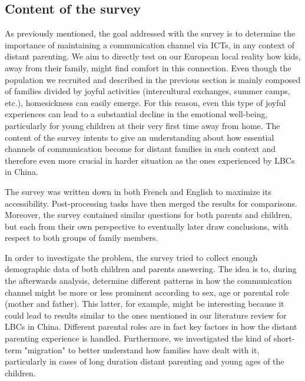 \subsection{Content of the survey}
\label{content-survey}

As previously mentioned, the goal addressed with the survey is to determine the importance of maintaining a communication channel via ICTs, in any context of distant parenting. We aim to directly test on our European local reality how kids, away from their family, might find comfort in this connection. Even though the population we recruited and described in the previous section is mainly composed of families divided by joyful activities (intercultural exchanges, summer camps, etc.), homesickness can easily emerge. For this reason, even this type of joyful experiences can lead to a substantial decline in the emotional well-being, particularly for young children at their very first time away from home. The content of the survey intents to give an understanding about how essential channels of communication become for distant families in such context and therefore even more crucial in harder situation as the ones experienced by LBCs in China.

The survey was written down in both French and English to maximize its accessibility. Post-processing tasks have then merged the results for comparisons. Moreover, the survey contained similar questions for both parents and children, but each from their own perspective to eventually later draw conclusions, with respect to both groups of family members.

In order to investigate the problem, the survey tried to collect enough demographic data of both children and parents answering. The idea is to, during the afterwards analysis, determine different patterns in how the communication channel might be more or less prominent according to sex, age or parental role (mother and father). This latter, for example, might be interesting because it could lead to results similar to the ones mentioned in our literature review for LBCs in China. Different parental roles are in fact key factors in how the distant parenting experience is handled. 
Furthermore, we investigated the kind of short-term "migration" to better understand how families have dealt with it, particularly in cases of long duration distant parenting and young ages of the children.

